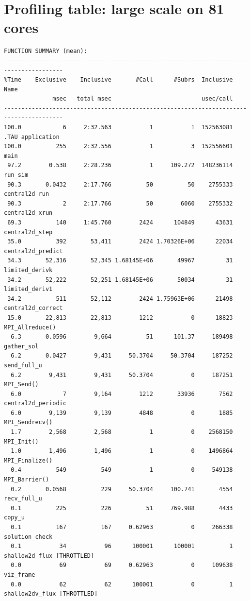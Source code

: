 \documentclass{article}
\begin{document}
\section{Profiling table: large scale on 81 cores}
\noindent
{\footnotesize
\begin{verbatim}
FUNCTION SUMMARY (mean):
---------------------------------------------------------------------------------------
%Time    Exclusive    Inclusive       #Call      #Subrs  Inclusive Name
              msec   total msec                          usec/call 
---------------------------------------------------------------------------------------
100.0            6     2:32.563           1           1  152563081 .TAU application
100.0          255     2:32.556           1           3  152556601 main 
 97.2        0.538     2:28.236           1     109.272  148236114 run_sim 
 90.3       0.0432     2:17.766          50          50    2755333 central2d_run 
 90.3            2     2:17.766          50        6060    2755332 central2d_xrun 
 69.3          140     1:45.760        2424      104849      43631 central2d_step 
 35.0          392       53,411        2424 1.70326E+06      22034 central2d_predict 
 34.3       52,316       52,345 1.68145E+06       49967         31 limited_derivk 
 34.2       52,222       52,251 1.68145E+06       50034         31 limited_deriv1 
 34.2          511       52,112        2424 1.75963E+06      21498 central2d_correct 
 15.0       22,813       22,813        1212           0      18823 MPI_Allreduce() 
  6.3       0.0596        9,664          51      101.37     189498 gather_sol 
  6.2       0.0427        9,431     50.3704     50.3704     187252 send_full_u 
  6.2        9,431        9,431     50.3704           0     187251 MPI_Send() 
  6.0            7        9,164        1212       33936       7562 central2d_periodic 
  6.0        9,139        9,139        4848           0       1885 MPI_Sendrecv() 
  1.7        2,568        2,568           1           0    2568150 MPI_Init() 
  1.0        1,496        1,496           1           0    1496864 MPI_Finalize() 
  0.4          549          549           1           0     549138 MPI_Barrier() 
  0.2       0.0568          229     50.3704     100.741       4554 recv_full_u 
  0.1          225          226          51     769.988       4433 copy_u 
  0.1          167          167     0.62963           0     266338 solution_check 
  0.1           34           96      100001      100001          1 shallow2d_flux [THROTTLED]
  0.0           69           69     0.62963           0     109638 viz_frame 
  0.0           62           62      100001           0          1 shallow2dv_flux [THROTTLED]

\end{verbatim}}
\end{document}

